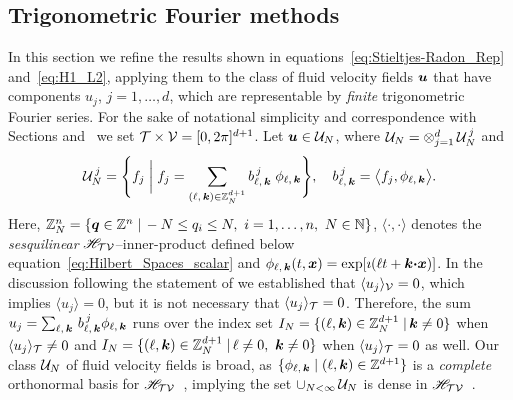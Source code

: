 \documentclass[amsa]{ipart}
\begin{document}
%
\subsection{Trigonometric Fourier methods}   
\label{sec:Trig:Fourier_Methods}
%
In this section we refine the results shown in
equations~\eqref{eq:Stieltjes-Radon_Rep} and~\eqref{eq:H1_L2},
applying them to the class of fluid velocity fields $\boldsymbol{u} $ that have
components $u_j$, $j=1,\ldots,d$, which are representable by 
\emph{finite} trigonometric Fourier series. For the sake of notational
simplicity and correspondence with Sections
 and~ we set
$\mathcal{T}\times\mathcal{V}=[0,2\pi]^{d+1}$. Let $\boldsymbol{u} \in\mathcal{U}_N$, where 
$\mathcal{U}_N=\otimes_{j=1}^d\,\mathcal{U}_N^{\,j}$ and  
%
\begin{align}\label{eq:velocity_field_space}
  \Uc_N^{\,j}=
  \Bigg\{f_j \;\bigg|\;
  f_j=\sum_{(\ell,\,\veck)\in\mathbb{Z}_N^{d+1}}b^{\,j}_{\ell,\,\veck}\;\phi_{\ell,\,\veck}
  \Bigg\}, 
   \quad
  b^{\,j}_{\ell,\,\veck}=\big\langle f_j,\phi_{\ell,\,\veck}\big\rangle.
\end{align}
%
Here, $\mathbb{Z}_N^n=\{\boldsymbol{q}\in\mathbb{Z}^n \;|\, -N\leq q_i\leq N, \
i=1,\ldots,n, \ N\in\mathbb{N}\}$, $\langle\cdot,\cdot\rangle$ denotes the \emph{sesquilinear}
$\mathscr{H}_{\mathcal{T}\mathcal{V}}$--inner-product defined below
equation~\eqref{eq:Hilbert_Spaces_scalar} and  
$\phi_{\ell,\,\boldsymbol{k}}(t,\boldsymbol{x})=\exp[\imath(\ell t+\boldsymbol{k}\mbox{\boldmath${\cdot}$}\boldsymbol{x})]$. In the
discussion following the statement of \thmref{thm:Integral_Reps} we
established that $\langle u_j\rangle_{\mathcal{V}}=0$, which implies $\langle u_j\rangle=0$, but it is
not necessary that $\langle u_j\rangle_{\mathcal{T}}=0$. Therefore, 
the sum $u_j=\sum_{\ell,\,\boldsymbol{k}}\,b^{\,j}_{\ell,\,\boldsymbol{k}}\phi_{\ell,\,\boldsymbol{k}}$ runs
over the index set $I_N=\{(\ell,\boldsymbol{k})\in\mathbb{Z}_N^{d+1} \;|\, \boldsymbol{k}\neq0\}$
when $\langle u_j\rangle_{\mathcal{T}}\neq0$ and $I_N=\{(\ell,\boldsymbol{k})\in\mathbb{Z}_N^{d+1} \;|\,
\ell\neq0, \ \boldsymbol{k}\neq0\}$ when $\langle u_j\rangle_{\mathcal{T}}=0$ as well. Our class $\mathcal{U}_N$ of
fluid velocity fields is broad, as $\{\phi_{\ell,\,\boldsymbol{k}} \;|\;
(\ell,\boldsymbol{k})\in\mathbb{Z}^{d+1}\}$ is a \emph{complete} orthonormal basis
for $\mathscr{H}_{\mathcal{T}\mathcal{V}}$~\cite{Folland:99:RealAnalysis}, implying the set
$\cup_{N<\infty}\,\mathcal{U}_N$ is dense in $\mathscr{H}_{\mathcal{T}\mathcal{V}}$~\cite{PapaRudin:87}.              
\end{document}
